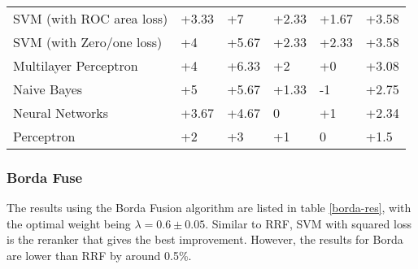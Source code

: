 \begin{table}[h]
{\begin{tabular}{@{}llllll@{}}
SVM (with ROC area loss)                                                                    & +3.33                    & +7                          & +2.33                    & +1.67                       & +3.58             \\ 
SVM (with Zero/one loss)                                                                        & +4                       & +5.67                       & +2.33                    & +2.33                       & +3.58             \\ 
Multilayer Perceptron								& +4 & +6.33 & +2 & +0 & +3.08 \\
Naive Bayes                                                                      & +5                       & +5.67                       & +1.33                    & -1                         & +2.75             \\ 
Neural Networks                                                                   & +3.67                    & +4.67                       & 0                       & +1                          & +2.34             \\ 
Perceptron                                                              & +2                       & +3                          & +1                       & 0                          & +1.5              \\ \bottomrule
\end{tabular}%
}
\end{table}

\subsubsection{Borda Fuse}
The results using the Borda Fusion algorithm are listed in table \ref{borda-res}, with the optimal weight being $\lambda=0.6\pm0.05$.
Similar to RRF, SVM with squared loss is the reranker that gives the best improvement. However, the results for Borda are lower
than RRF by around 0.5\%.

